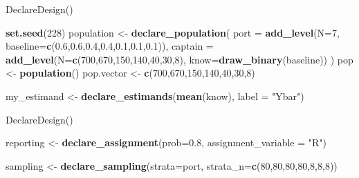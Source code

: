 \documentclass[ignorenonframetext,]{beamer}
\newenvironment{Shaded}{\begin{snugshade}}{\end{snugshade}}
\newcommand{\DataTypeTok}[1]{\textcolor[rgb]{0.13,0.29,0.53}{#1}}
\newcommand{\DecValTok}[1]{\textcolor[rgb]{0.00,0.00,0.81}{#1}}
\newcommand{\FloatTok}[1]{\textcolor[rgb]{0.00,0.00,0.81}{#1}}
\newcommand{\KeywordTok}[1]{\textcolor[rgb]{0.13,0.29,0.53}{\textbf{#1}}}
\newcommand{\NormalTok}[1]{#1}
\newcommand{\StringTok}[1]{\textcolor[rgb]{0.31,0.60,0.02}{#1}}
\begin{document}
\begin{frame}[fragile]{DeclareDesign()}
\protect\hypertarget{declaredesign}{}

\begin{Shaded}
\begin{Highlighting}[]
\KeywordTok{set.seed}\NormalTok{(}\DecValTok{228}\NormalTok{)}
\NormalTok{population <-}\StringTok{ }\KeywordTok{declare_population}\NormalTok{(}
  \DataTypeTok{port =} \KeywordTok{add_level}\NormalTok{(}\DataTypeTok{N=}\DecValTok{7}\NormalTok{,}
         \DataTypeTok{baseline=}\KeywordTok{c}\NormalTok{(}\FloatTok{0.6}\NormalTok{,}\FloatTok{0.6}\NormalTok{,}\FloatTok{0.4}\NormalTok{,}\FloatTok{0.4}\NormalTok{,}\FloatTok{0.1}\NormalTok{,}\FloatTok{0.1}\NormalTok{,}\FloatTok{0.1}\NormalTok{)),}
  \DataTypeTok{captain =} \KeywordTok{add_level}\NormalTok{(}\DataTypeTok{N=}\KeywordTok{c}\NormalTok{(}\DecValTok{700}\NormalTok{,}\DecValTok{670}\NormalTok{,}\DecValTok{150}\NormalTok{,}\DecValTok{140}\NormalTok{,}\DecValTok{40}\NormalTok{,}\DecValTok{30}\NormalTok{,}\DecValTok{8}\NormalTok{),}
                      \DataTypeTok{know=}\KeywordTok{draw_binary}\NormalTok{(baseline))}
\NormalTok{)}
\NormalTok{pop <-}\StringTok{ }\KeywordTok{population}\NormalTok{()}
\NormalTok{pop.vector <-}\StringTok{ }\KeywordTok{c}\NormalTok{(}\DecValTok{700}\NormalTok{,}\DecValTok{670}\NormalTok{,}\DecValTok{150}\NormalTok{,}\DecValTok{140}\NormalTok{,}\DecValTok{40}\NormalTok{,}\DecValTok{30}\NormalTok{,}\DecValTok{8}\NormalTok{)}

\NormalTok{my_estimand <-}\StringTok{ }\KeywordTok{declare_estimands}\NormalTok{(}\KeywordTok{mean}\NormalTok{(know),}
                                 \DataTypeTok{label =} \StringTok{"Ybar"}\NormalTok{)}
\end{Highlighting}
\end{Shaded}

\end{frame}

\begin{frame}[fragile]{DeclareDesign()}
\protect\hypertarget{declaredesign-1}{}

\begin{Shaded}
\begin{Highlighting}[]
\NormalTok{reporting <-}\StringTok{ }\KeywordTok{declare_assignment}\NormalTok{(}\DataTypeTok{prob=}\FloatTok{0.8}\NormalTok{,}
                  \DataTypeTok{assignment_variable =} \StringTok{"R"}\NormalTok{)}

\NormalTok{sampling <-}\StringTok{ }\KeywordTok{declare_sampling}\NormalTok{(}\DataTypeTok{strata=}\NormalTok{port,}
               \DataTypeTok{strata_n=}\KeywordTok{c}\NormalTok{(}\DecValTok{80}\NormalTok{,}\DecValTok{80}\NormalTok{,}\DecValTok{80}\NormalTok{,}\DecValTok{80}\NormalTok{,}\DecValTok{8}\NormalTok{,}\DecValTok{8}\NormalTok{,}\DecValTok{8}\NormalTok{))}
\end{Highlighting}
\end{Shaded}

\end{frame}
\end{document}
